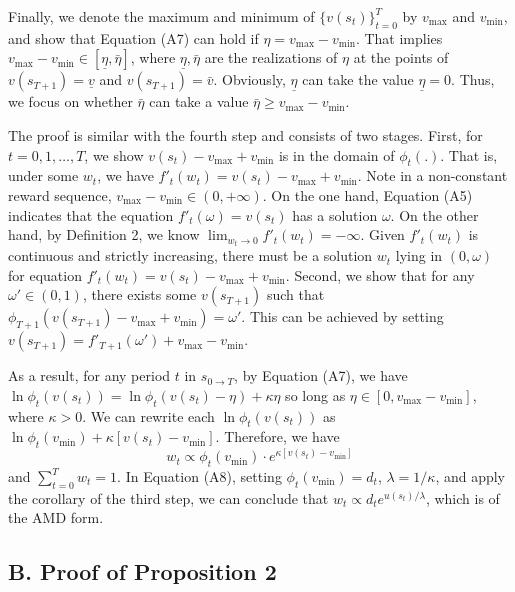 \documentclass[
  12pt,
]{article}
\begin{document}
Finally, we denote the maximum and minimum of \(\{v(s_t)\}_{t=0}^T\) by
\(v_{\max}\) and \(v_{\min}\), and show that Equation (A7) can hold if
\(\eta = v_{\max} - v_{\min}\). That implies
\(v_{\max}-v_{\min}\in [\underline{\eta},\bar{\eta}]\), where
\(\underline{\eta}, \bar{\eta}\) are the realizations of \(\eta\) at the
points of \(v(s_{T+1})=\underline{v}\) and \(v(s_{T+1})=\bar{v}\).
Obviously, \(\underline{\eta}\) can take the value
\(\underline{\eta}=0\). Thus, we focus on whether \(\bar{\eta}\) can
take a value \(\bar{\eta}\geq v_{\max}-v_{\min}\).

The proof is similar with the fourth step and consists of two stages.
First, for \(t=0,1,…,T\), we show \(v(s_t)-v_{\max}+v_{\min}\) is in the
domain of \(\phi_t(.)\). That is, under some \(w_t\), we have
\(f'_t(w_t)=v(s_t)-v_{\max}+v_{\min}\). Note in a non-constant reward
sequence, \(v_{\max}-v_{\min}\in(0,+\infty)\). On the one hand, Equation
(A5) indicates that the equation \(f'_t(\omega)=v(s_t)\) has a solution
\(\omega\). On the other hand, by Definition 2, we know
\(\lim_{w_t\rightarrow 0}f'_t(w_t)=-\infty\). Given \(f'_t(w_t)\) is
continuous and strictly increasing, there must be a solution \(w_t\)
lying in \((0,\omega)\) for equation
\(f'_t(w_t)=v(s_t)-v_{\max}+v_{\min}\). Second, we show that for any
\(\omega'\in(0,1)\), there exists some \(v(s_{T+1})\) such that
\(\phi_{T+1}(v(s_{T+1})-v_{\max}+v_{\min})=\omega'\). This can be
achieved by setting \(v(s_{T+1})=f'_{T+1}(\omega')+v_{\max}-v_{\min}\).

As a result, for any period \(t\) in \(s_{0\rightarrow T}\), by Equation
(A7), we have \(\ln \phi_t(v(s_t))=\ln\phi_t(v(s_t)-\eta)+\kappa\eta\)
so long as \(\eta\in[0,v_{\max}-v_{\min}]\), where \(\kappa>0\). We can
rewrite each \(\ln \phi_t(v(s_t))\) as
\(\ln \phi_t(v_{\min})+\kappa[v(s_t)-v_{\min}]\). Therefore, we
have\[\tag{A8}
w_t \propto \phi_t(v_{\min})\cdot e^{\kappa[v(s_t)-v_{\min}]}
\]and \(\sum_{t=0}^T w_t=1\). In Equation (A8), setting
\(\phi_t(v_{\min})=d_t\), \(\lambda = 1/\kappa\), and apply the
corollary of the third step, we can conclude that
\(w_t\propto d_t e^{u(s_t)/\lambda}\), which is of the AMD form.

\hypertarget{b.-proof-of-proposition-2}{%
\subsection*{B. Proof of Proposition
2}\label{b.-proof-of-proposition-2}}
\end{document}
